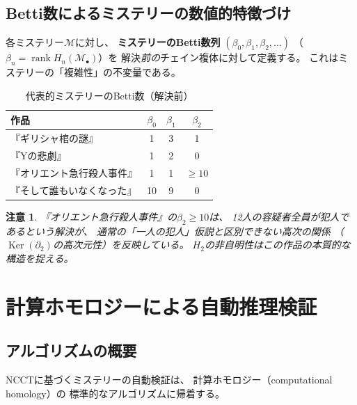 \documentclass[12pt,twocolumn]{ltjsarticle}
\newtheorem{remark}[theorem]{注意}
\newcommand{\Ker}{\operatorname{Ker}}
\renewcommand{\rank}{\operatorname{rank}}
\newcommand{\Mys}{\mathcal{M}}
\begin{document}
\subsection{Betti数によるミステリーの数値的特徴づけ}

各ミステリー$\Mys$に対し、
\textbf{ミステリーのBetti数列}
$(\beta_0, \beta_1, \beta_2, \ldots)$
（$\beta_n = \rank H_n(\Mys_\bullet)$）を
解決\emph{前の}チェイン複体に対して定義する。
これはミステリーの「複雑性」の不変量である。

\begin{table}[h]
\centering
\caption{代表的ミステリーのBetti数（解決前）}
\label{tab:betti}
\begin{tabular}{lccc}
\toprule
\textbf{作品} & $\beta_0$ & $\beta_1$ & $\beta_2$ \\
\midrule
『ギリシャ棺の謎』 & 1 & 3 & 1 \\
『Yの悲劇』 & 1 & 2 & 0 \\
『オリエント急行殺人事件』 & 1 & 1 & $\geq 10$ \\
『そして誰もいなくなった』 & 10 & 9 & 0 \\
\bottomrule
\end{tabular}
\end{table}

\begin{remark}
『オリエント急行殺人事件』の$\beta_2 \geq 10$は、
12人の容疑者全員が犯人であるという解決が、
通常の「一人の犯人」仮説と区別できない高次の関係
（$\Ker(\partial_2)$の高次元性）を反映している。
$H_2$の非自明性はこの作品の本質的な構造を捉える。
\end{remark}


\section{計算ホモロジーによる自動推理検証}
\label{sec:computation}

\subsection{アルゴリズムの概要}

NCCTに基づくミステリーの自動検証は、
計算ホモロジー（computational homology）の
標準的なアルゴリズムに帰着する。
\end{document}
